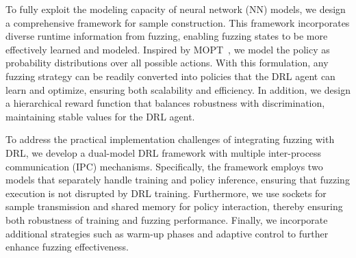 \documentclass[lettersize,journal]{IEEEtran}
\begin{document}
To fully exploit the modeling capacity of neural network (NN) models, we design a comprehensive framework for sample construction. This framework incorporates diverse runtime information from fuzzing, enabling fuzzing states to be more effectively learned and modeled. Inspired by MOPT~\cite{lyuMOPTOptimizedMutation2019}, we model the policy as probability distributions over all possible actions. With this formulation, any fuzzing strategy can be readily converted into policies that the DRL agent can learn and optimize, ensuring both scalability and efficiency. In addition, we design a hierarchical reward function that balances robustness with discrimination, maintaining stable values for the DRL agent.

To address the practical implementation challenges of integrating fuzzing with DRL, we develop a dual-model DRL framework with multiple inter-process communication (IPC) mechanisms. Specifically, the framework employs two models that separately handle training and policy inference, ensuring that fuzzing execution is not disrupted by DRL training. Furthermore, we use sockets for sample transmission and shared memory for policy interaction, thereby ensuring both robustness of training and fuzzing performance. Finally, we incorporate additional strategies such as warm-up phases and adaptive control to further enhance fuzzing effectiveness.
\end{document}
